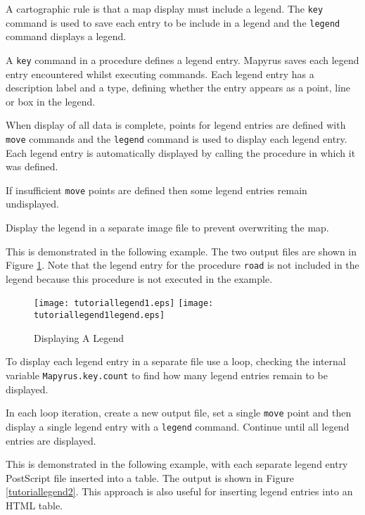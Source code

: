 A cartographic rule is that a map display must include a legend.  The
\texttt{key} command is used to save each entry to be include in a legend and
the \texttt{legend} command displays a legend.

A \texttt{key} command in a procedure defines a legend entry.  Mapyrus saves
each legend entry encountered whilst executing commands.  Each legend entry has
a description label and a type, defining whether the entry appears as a point,
line or box in the legend.

When display of all data is complete, points for legend entries are defined
with \texttt{move} commands and the \texttt{legend} command is used to display
each legend entry.  Each legend entry is automatically displayed by calling the
procedure in which it was defined.

If insufficient \texttt{move} points are defined then some legend entries
remain undisplayed.

Display the legend in a separate image file to prevent overwriting the map.

This is demonstrated in the following example.
The two output files are shown in Figure \ref{tutoriallegend1}.
Note that the legend entry for the procedure \texttt{road} is
not included in the legend because this procedure is not
executed in the example.



\begin{figure}[htb]
\texttt{[image: tutoriallegend1.eps]}
\texttt{[image: tutoriallegend1legend.eps]}
\caption{Displaying A Legend}
\label{tutoriallegend1}
\end{figure}

To display each legend entry in a separate file use a loop, checking the
internal variable \texttt{Mapyrus.key.count} to find how many legend entries
remain to be displayed.

In each loop iteration, create a new output file, set a single \texttt{move}
point and then display a single legend entry with a \texttt{legend} command.
Continue until all legend entries are displayed.

This is demonstrated in the following example, with each separate legend entry
PostScript file inserted into a table.  The output is shown in Figure
\ref{tutoriallegend2}.  This approach is also useful for inserting legend
entries into an HTML table.



